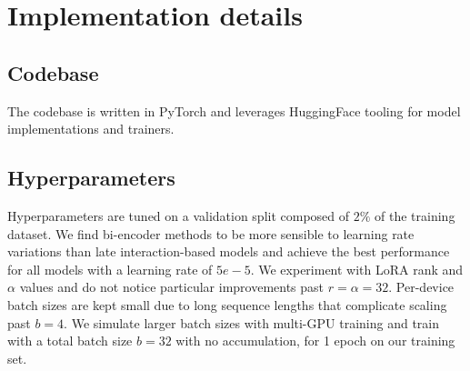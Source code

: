 \begin{table}[ht]
    \centering
    \label{tab:datasets}
    \small
    \caption[ColPali dataset splits]{Details on the different splits in the dataset used to train ColPali.}
    \label{table:training_set_overview}
\end{table}



\section{Implementation details}

\subsection{Codebase}
The codebase is written in PyTorch and leverages HuggingFace tooling for model implementations and trainers.


\subsection{Hyperparameters}

Hyperparameters are tuned on a validation split composed of $2\%$ of the training dataset. We find bi-encoder methods to be more sensible to learning rate variations than late interaction-based models and achieve the best performance for all models with a learning rate of $5e-5$. We experiment with LoRA rank and $\alpha$ values and do not notice particular improvements past $r = \alpha = 32$. Per-device batch sizes are kept small due to long sequence lengths that complicate scaling past $b=4$. We simulate larger batch sizes with multi-GPU training and train with a total batch size $b=32$ with no accumulation, for 1 epoch on our training set.


